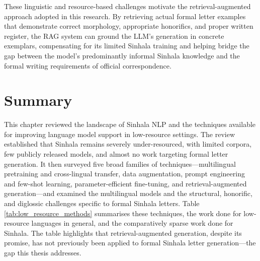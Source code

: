 \documentclass[12pt]{uomthesis}
\begin{document}
These linguistic and resource-based challenges motivate the retrieval-augmented approach adopted in this research. By retrieving actual formal letter examples that demonstrate correct morphology, appropriate honorifics, and proper written register, the RAG system can ground the LLM's generation in concrete exemplars, compensating for its limited Sinhala training and helping bridge the gap between the model's predominantly informal Sinhala knowledge and the formal writing requirements of official correspondence.

\section{Summary}

This chapter reviewed the landscape of Sinhala NLP and the techniques available for improving language model support in low-resource settings. The review established that Sinhala remains severely under-resourced, with limited corpora, few publicly released models, and almost no work targeting formal letter generation. It then surveyed five broad families of techniques—multilingual pretraining and cross-lingual transfer, data augmentation, prompt engineering and few-shot learning, parameter-efficient fine-tuning, and retrieval-augmented generation—and examined the multilingual models and the structural, honorific, and diglossic challenges specific to formal Sinhala letters. Table \ref{tab:low_resource_methods} summarises these techniques, the work done for low-resource languages in general, and the comparatively sparse work done for Sinhala. The table highlights that retrieval-augmented generation, despite its promise, has not previously been applied to formal Sinhala letter generation—the gap this thesis addresses.
\end{document}
